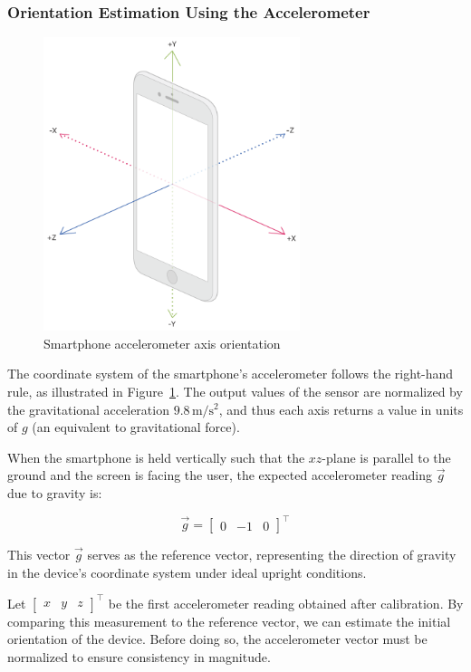 \documentclass{article}
\begin{document}
\subsubsection{Orientation Estimation Using the Accelerometer}

\FloatBarrier
\begin{figure}[h]
    \centering
    \includegraphics[width=7.5cm]{Images/accelerometer.png}
    \caption{Smartphone accelerometer axis orientation}
    \label{fig:accelerometer}
\end{figure}

The coordinate system of the smartphone's accelerometer follows the right-hand rule, as illustrated in Figure~\ref{fig:accelerometer}. The output values of the sensor are normalized by the gravitational acceleration $9.8\,\mathrm{m/s^2}$, and thus each axis returns a value in units of $g$ (an equivalent to gravitational force).

When the smartphone is held vertically such that the $xz$-plane is parallel to the ground and the screen is facing the user, the expected accelerometer reading $ \vec{g}$ due to gravity is:

\[
 \vec{g} = \begin{bmatrix} 0 & -1 & 0 \end{bmatrix}^\top
\]

This vector $ \vec{g}$ serves as the reference vector, representing the direction of gravity in the device's coordinate system under ideal upright conditions.

Let $\begin{bmatrix}x&y&z\end{bmatrix}^\top$ be the first accelerometer reading obtained after calibration. By comparing this measurement to the reference vector, we can estimate the initial orientation of the device. Before doing so, the accelerometer vector must be normalized to ensure consistency in magnitude.
\end{document}
